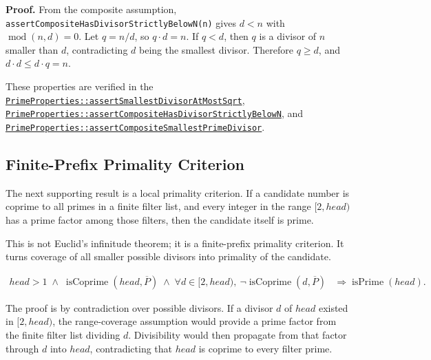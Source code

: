 \textbf{Proof.} From the composite assumption,
\texttt{assertCompositeHasDivisorStrictlyBelowN(n)} gives $d < n$ with
$\operatorname{mod}(n, d) = 0$. Let $q = n / d$, so $q \cdot d = n$. If
$q < d$, then $q$ is a divisor of $n$ smaller than $d$, contradicting $d$
being the smallest divisor. Therefore $q \ge d$, and
$d \cdot d \le d \cdot q = n$.

{\raggedright
These properties are verified in the
\href{https://github.com/thiagomata/prime-numbers/blob/euclid-theorem-article-v1.0.0/src/main/scala/v1/chapter5/prime/properties/PrimeProperties.scala}{\texttt{PrimeProperties::assertSmallestDivisorAtMostSqrt}},
\href{https://github.com/thiagomata/prime-numbers/blob/euclid-theorem-article-v1.0.0/src/main/scala/v1/chapter5/prime/properties/PrimeProperties.scala}{\texttt{PrimeProperties::assertCompositeHasDivisorStrictlyBelowN}},
and
\href{https://github.com/thiagomata/prime-numbers/blob/euclid-theorem-article-v1.0.0/src/main/scala/v1/chapter5/prime/properties/PrimeProperties.scala}{\texttt{PrimeProperties::assertCompositeSmallestPrimeDivisor}}.
\par}

\subsection{Finite-Prefix Primality Criterion}
\label{sec:finite-prefix-primality}

The next supporting result is a local primality criterion. If a candidate
number is coprime to all primes in a finite filter list, and every integer
in the range $[2, head)$ has a prime factor among those filters, then the
candidate itself is prime.

This is not Euclid's infinitude theorem; it is a finite-prefix primality
criterion. It turns coverage of all smaller possible divisors into
primality of the candidate.

\begin{equation*}
\begin{aligned}
head > 1
\;\land\; \operatorname{isCoprime}(head,\overline P)
\;\land\;
\forall d\in[2,head),\ \neg \operatorname{isCoprime}(d,\overline P)
&\Rightarrow \operatorname{isPrime}(head).
\end{aligned}
\end{equation*}

The proof is by contradiction over possible divisors. If a divisor $d$ of
$head$ existed in $[2, head)$, the range-coverage assumption would provide
a prime factor from the finite filter list dividing $d$. Divisibility
would then propagate from that factor through $d$ into $head$,
contradicting that $head$ is coprime to every filter prime.

